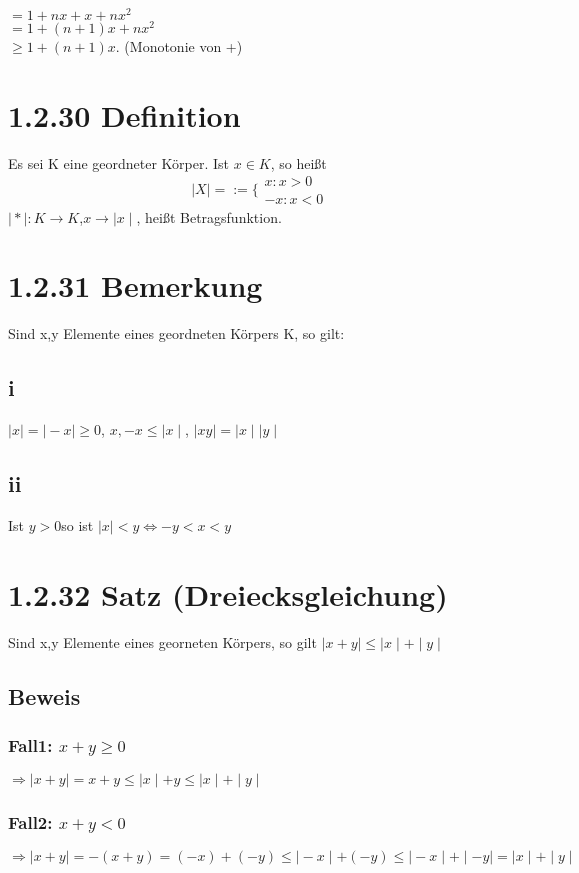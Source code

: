 \documentclass[11pt]{scrartcl}
\begin{document}
$= 1+nx+x+nx^2$ \\
$= 1+(n+1)x + nx^2$ \\
$\geq 1+(n+1)x$. (Monotonie von +)

\section{1.2.30 Definition}
Es sei K eine geordneter Körper. Ist $x \in K$, so heißt \\

 \[
 \mid X \mid =\left. := \{
 \begin{array}{ll}
 x : x > 0 \\
 -x : x < 0
 \end{array}
 \right.
 \] 
 $\mid * \mid : K \rightarrow K$,$x \rightarrow \mid x \mid$, heißt Betragsfunktion.

\section{1.2.31 Bemerkung}
Sind x,y Elemente eines geordneten Körpers K, so  gilt:
\subsection*{i}
$\mid x \mid = \mid -x \mid \geq 0$,
$x,-x \leq \mid x \mid$,
$\mid xy \mid = \mid x \mid \mid y \mid$
\subsection*{ii}
Ist $y > 0 $so ist $\mid x \mid < y \iff -y < x < y $

\section{1.2.32 Satz (Dreiecksgleichung)}
Sind x,y Elemente eines georneten Körpers, so gilt $\mid x+y \mid \leq \mid x \mid + \mid y \mid $
\subsection*{Beweis}
\subsubsection*{Fall1: $x+y \geq 0$}
$\Rightarrow \mid x+y \mid = x+y \leq \mid x \mid + y \leq \mid x \mid + \mid y \mid$
\subsubsection*{Fall2: $x+y < 0$}
$\Rightarrow \mid x+y \mid = -(x+y) = (-x)+(-y) \leq \mid -x \mid + (-y) \leq \mid -x \mid + \mid -y \mid = \mid x \mid + \mid y \mid$
\end{document}

